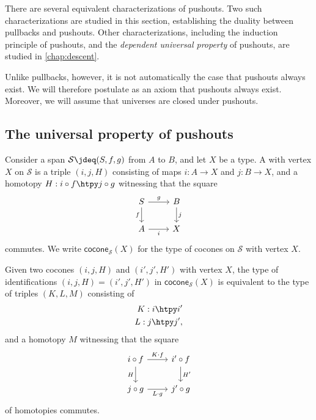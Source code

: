 There are several equivalent characterizations of pushouts. Two such characterizations are studied in this section, establishing the duality between pullbacks and pushouts. Other characterizations, including the induction principle of pushouts, and the \emph{dependent universal property} of pushouts, are studied in \cref{chap:descent}.

Unlike pullbacks, however, it is not automatically the case that pushouts always exist. We will therefore postulate as an axiom that pushouts always exist. Moreover, we will assume that universes are closed under pushouts.

\subsection{The universal property of pushouts}

\begin{defn}
Consider a span $\mathcal{S}\jdeq (S,f,g)$ from $A$ to $B$, and let $X$ be a type.
A  with vertex $X$ on $\mathcal{S}$ is a triple $(i,j,H)$ consisting of maps $i:A\to X$ and $j:B\to X$, and a homotopy $H:i\circ f\htpy j\circ g$ witnessing that the square
\begin{equation*}
\begin{tikzcd}
S \arrow[r,"g"] \arrow[d,swap,"f"] & B \arrow[d,"j"] \\
A \arrow[r,swap,"i"] & X
\end{tikzcd}
\end{equation*}
commutes.
We write $\mathsf{cocone}_{\mathcal{S}}(X)$ for the type of cocones on $\mathcal{S}$ with vertex $X$.
\end{defn}

\begin{rmk}\label{rmk:htpy-cocone}
  Given two cocones $(i,j,H)$ and $(i',j',H')$ with vertex $X$, the type of identifications $(i,j,H)=(i',j',H')$ in $\mathsf{cocone}_{\mathcal{S}}(X)$ is equivalent to the type of triples $(K,L,M)$ consisting of
  \begin{align*}
    K : i\htpy i' \\
    L : j\htpy j',
  \end{align*}
  and a homotopy $M$ witnessing that the square
  \begin{equation*}
    \begin{tikzcd}
      i\circ f \arrow[d,swap,"H"] \arrow[r,"K\cdot f"] & i' \circ f \arrow[d,"{H'}"] \\
      j\circ g \arrow[r,swap,"L\cdot g"] & j'\circ g
    \end{tikzcd}
  \end{equation*}
  of homotopies commutes.
\end{rmk}

